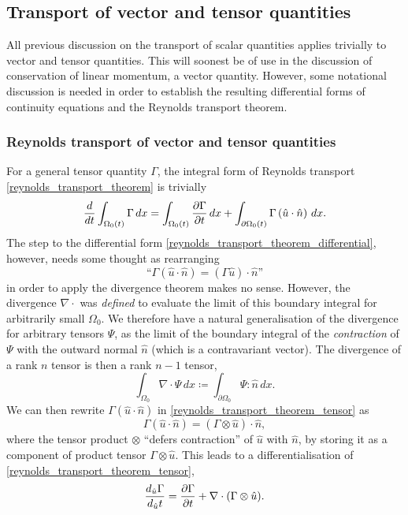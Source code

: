 \subsection{Transport of vector and tensor quantities}
All previous discussion on the transport of scalar quantities applies trivially to vector and tensor quantities.
This will soonest be of use in the discussion of conservation of linear momentum, a vector quantity.
However, some notational discussion is needed in order to establish the resulting differential forms of continuity equations and the Reynolds transport theorem.
\subsubsection{Reynolds transport of vector and tensor quantities}
For a general tensor quantity $\Gamma$, the integral form of Reynolds transport \eqref{reynolds_transport_theorem} is trivially
\begin{equation}\label{reynolds_transport_theorem_tensor}
    \frac{d}{dt}\int_{\Omega_0(t)}\Gamma\,dx =
        \int_{\Omega_0(t)}\frac{\partial \Gamma}{\partial t}\,dx + \int_{\partial\Omega_0(t)}\Gamma \left(\hat{u}\cdot\hat{n}\right) \,dx.
\end{equation}
The step to the differential form \eqref{reynolds_transport_theorem_differential}, however, needs some thought
as rearranging
    $$\text{``}\Gamma\left(\hat{u}\cdot \hat{n}\right) = (\Gamma\hat{u})\cdot \hat{n}\text{''}$$
in order to apply the divergence theorem makes no sense. However, the divergence $\nabla \cdot$ was \textit{defined}
to evaluate the limit of this boundary integral for arbitrarily small $\Omega_0$. We therefore have a natural generalisation of the
divergence for arbitrary tensors $\Psi$, as the limit of the boundary integral of the \textit{contraction} of $\Psi$ with the outward normal
$\hat{n}$ (which is a contravariant vector). The divergence of a rank $n$ tensor is then a rank $n-1$ tensor,
\begin{equation}\label{tensor_divergence}
    \int_{\Omega_0} \nabla\cdot\Psi\,dx \coloneqq
        \int_{\partial{\Omega_0}} \Psi : \hat{n}\,dx.
\end{equation}
We can then rewrite $\Gamma \left(\hat{u}\cdot \hat{n}\right)$ in \eqref{reynolds_transport_theorem_tensor} as
    $$\Gamma \left(\hat{u}\cdot \hat{n}\right) = \left(\Gamma \otimes \hat{u}\right) \cdot \hat{n},$$
where the tensor product $\otimes$ ``defers contraction'' of $\hat{u}$ with $\hat{n}$, by storing it as a component of product tensor $\Gamma \otimes \hat{u}$.
This leads to a differentialisation of \eqref{reynolds_transport_theorem_tensor},
\begin{equation}\label{reynolds_transport_theorem_tensor_differential}
    \frac{d_{\hat{u}}\Gamma}{d_{\hat{u}}t} = \frac{\partial \Gamma}{\partial t} + \nabla \cdot(\Gamma \otimes \hat{u}).
\end{equation}

